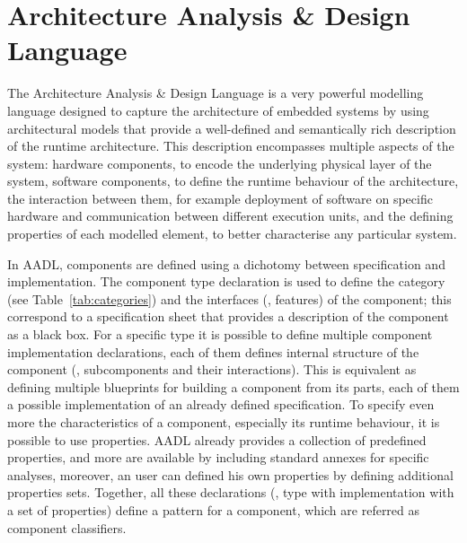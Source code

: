 \minitoc
\newpage

\section{Architecture Analysis \& Design Language}
The Architecture Analysis \& Design Language is a very powerful modelling language designed to capture the architecture of embedded systems by using architectural models that provide a well-defined and semantically rich description of the runtime architecture. This description encompasses multiple aspects of the system: hardware components, to encode the underlying physical layer of the system, software components, to define the runtime behaviour of the architecture, the interaction between them, for example deployment of software on specific hardware and communication between different execution units, and the defining properties of each modelled element, to better characterise any particular system.

 In AADL, components are defined using a dichotomy between specification and implementation. The component type declaration is used to define the category (see Table~\ref{tab:categories}) and the interfaces (\ie, features) of the component; this correspond to a specification sheet that provides a description of the component as a black box. For a specific type it is possible to define multiple component implementation declarations, each of them defines internal structure of the component (\ie, subcomponents and their interactions). This is equivalent as defining multiple blueprints for building a component from its parts, each of them a possible implementation of an already defined specification. To specify even more the characteristics of a component, especially its runtime behaviour, it is possible to use properties. AADL already provides a collection of predefined properties, and more are available by including standard annexes for specific analyses, moreover, an user can defined his own properties by defining additional properties sets. Together, all these declarations (\ie, type with implementation with a set of properties) define a pattern for a component, which are referred as component classifiers.
 
